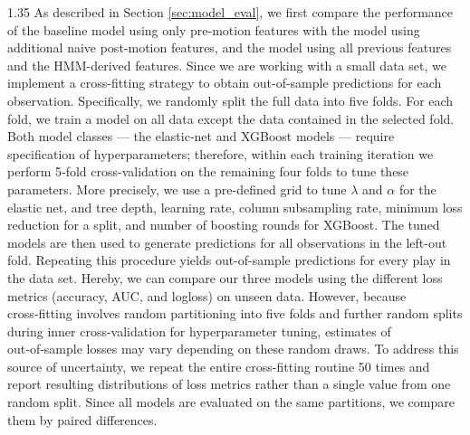 \documentclass[12pt,a4paper]{article}
\begin{document}
\begin{spacing}{1.35}
As described in Section \ref{sec:model_eval}, we first compare the performance of the baseline model using only pre-motion features with the model using additional naive post-motion features, %
and the model using all previous features and the HMM-derived features. %
Since we are working with a small data set, we implement a cross-fitting strategy to obtain out-of-sample predictions for each observation. Specifically, we randomly split the full data into five folds. For each fold, we train a model on all data except the data contained in the selected fold.  Both model classes --- the elastic‑net and XGBoost models --- require specification of hyperparameters; therefore, within each training iteration we perform 5‑fold cross-validation on the remaining four folds to tune these parameters. More precisely, we use a pre-defined grid to tune \( \lambda \) and $\alpha$ for the elastic net, and tree depth, learning rate, column subsampling rate, minimum loss reduction for a split, and number of boosting rounds for XGBoost. The tuned models are then used to generate predictions for all observations in the left-out fold. Repeating this procedure yields out-of-sample predictions for every play in the data set. Hereby, we can compare our three models using the different loss metrics (accuracy, AUC, and logloss) on unseen data. However, because cross‑fitting involves random partitioning into five folds and further random splits during inner cross-validation for hyperparameter tuning, estimates of out‑of‑sample losses may vary depending on these random draws. To address this source of uncertainty, we repeat the entire cross-fitting routine 50 times and report resulting distributions of loss metrics rather than a single value from one random split. Since all models are evaluated on the same partitions, we compare them by paired differences.



\end{spacing}
\end{document}
